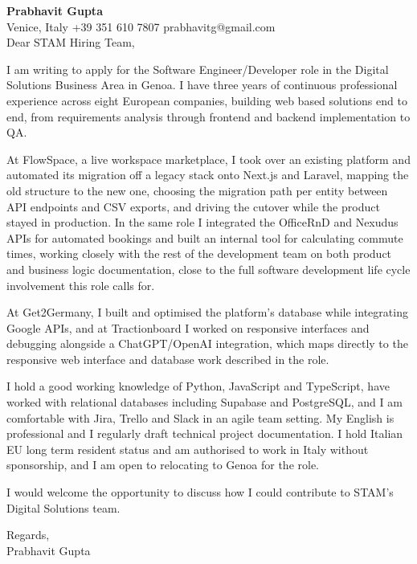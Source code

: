 \documentclass[a4paper,10.5pt]{article}
\begin{document}
\textbf{Prabhavit Gupta}\\
Venice, Italy \textbar{} +39 351 610 7807 \textbar{} prabhavitg@gmail.com\\[10pt]
Dear STAM Hiring Team,

I am writing to apply for the Software Engineer/Developer role in the Digital Solutions Business Area in Genoa. I have three years of continuous professional experience across eight European companies, building web based solutions end to end, from requirements analysis through frontend and backend implementation to QA.

At FlowSpace, a live workspace marketplace, I took over an existing platform and automated its migration off a legacy stack onto Next.js and Laravel, mapping the old structure to the new one, choosing the migration path per entity between API endpoints and CSV exports, and driving the cutover while the product stayed in production. In the same role I integrated the OfficeRnD and Nexudus APIs for automated bookings and built an internal tool for calculating commute times, working closely with the rest of the development team on both product and business logic documentation, close to the full software development life cycle involvement this role calls for.

At Get2Germany, I built and optimised the platform's database while integrating Google APIs, and at Tractionboard I worked on responsive interfaces and debugging alongside a ChatGPT/OpenAI integration, which maps directly to the responsive web interface and database work described in the role.

I hold a good working knowledge of Python, JavaScript and TypeScript, have worked with relational databases including Supabase and PostgreSQL, and I am comfortable with Jira, Trello and Slack in an agile team setting. My English is professional and I regularly draft technical project documentation. I hold Italian EU long term resident status and am authorised to work in Italy without sponsorship, and I am open to relocating to Genoa for the role.

I would welcome the opportunity to discuss how I could contribute to STAM's Digital Solutions team.

Regards,\\
Prabhavit Gupta
\end{document}
